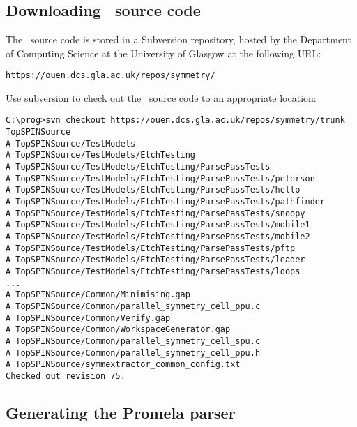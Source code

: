 \chapter{\buildingfromsource}\label{chapter:compilingfromsource}


\section{Downloading \protect\topspin\ source
code}\label{sec:compilingfromsource:downloading}

The \topspin\ source code is stored in a Subversion repository,
hosted by the Department of Computing Science at the University of
Glasgow at the following URL:
%
\begin{lstlisting}
https://ouen.dcs.gla.ac.uk/repos/symmetry/
\end{lstlisting}
%
Use subversion to check out the \topspin\ source code to an
appropriate location:
%
\begin{lstlisting}
C:\prog>svn checkout https://ouen.dcs.gla.ac.uk/repos/symmetry/trunk TopSPINSource
A TopSPINSource/TestModels
A TopSPINSource/TestModels/EtchTesting
A TopSPINSource/TestModels/EtchTesting/ParsePassTests
A TopSPINSource/TestModels/EtchTesting/ParsePassTests/peterson
A TopSPINSource/TestModels/EtchTesting/ParsePassTests/hello
A TopSPINSource/TestModels/EtchTesting/ParsePassTests/pathfinder
A TopSPINSource/TestModels/EtchTesting/ParsePassTests/snoopy
A TopSPINSource/TestModels/EtchTesting/ParsePassTests/mobile1
A TopSPINSource/TestModels/EtchTesting/ParsePassTests/mobile2
A TopSPINSource/TestModels/EtchTesting/ParsePassTests/pftp
A TopSPINSource/TestModels/EtchTesting/ParsePassTests/leader
A TopSPINSource/TestModels/EtchTesting/ParsePassTests/loops
...
A TopSPINSource/Common/Minimising.gap
A TopSPINSource/Common/parallel_symmetry_cell_ppu.c
A TopSPINSource/Common/Verify.gap
A TopSPINSource/Common/WorkspaceGenerator.gap
A TopSPINSource/Common/parallel_symmetry_cell_spu.c
A TopSPINSource/Common/parallel_symmetry_cell_ppu.h
A TopSPINSource/symmextractor_common_config.txt
Checked out revision 75.
\end{lstlisting}

\section{Generating the Promela parser}\label{sec:compilingfromsource:generating}

